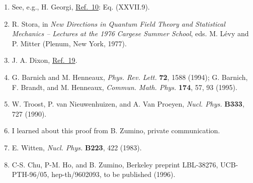 \begin{enumerate}
\item[19a.] \label{ch22-ref-19a}
See, e.g., H. Georgi, \hyperref[ch22-ref-10]{Ref.~10}: Eq. (XXVII.9).

\item {}\label{ch22-ref-20}
R. Stora, in \emph{New Directions in Quantum Field Theory and Statistical
Mechanics -- Lectures at the 1976 Cargese Summer School}, eds. M. L\'evy
and P. Mitter (Plenum, New York, 1977).

\item {}\label{ch22-ref-21}
J. A. Dixon, \hyperref[ch22-ref-19]{Ref.~19}.

\item {}\label{ch22-ref-22}
G. Barnich and M. Henneaux, \emph{Phys. Rev. Lett.} \textbf{72}, 1588
(1994); G. Barnich, F. Brandt, and M. Henneaux,
\emph{Commun. Math. Phys.} \textbf{174}, 57, 93 (1995).

\item {}\label{ch22-ref-23}
W. Troost, P. van Nieuwenhuizen, and A. Van Proeyen,
\emph{Nucl. Phys.} \textbf{B333}, 727 (1990).

\item {}\label{ch22-ref-24}
I learned about this proof from B. Zumino, private communication.

\item {}\label{ch22-ref-25}
E. Witten, \emph{Nucl. Phys.} \textbf{B223}, 422 (1983).

\item {}\label{ch22-ref-26}
C-S. Chu, P-M. Ho, and B. Zumino, Berkeley preprint LBL-38276,
UCB-PTH-96/05, hep-th/9602093, to be published (1996).
\end{enumerate}
